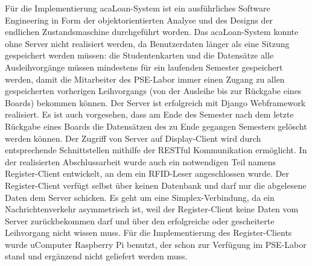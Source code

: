 Für die Implementierung acaLoan-System ist ein ausführliches Software Engineering in Form der objektorientierten Analyse und des Designs der endlichen Zustandsmaschine durchgeführt worden. Das acaLoan-System konnte ohne Server nicht realisiert werden, da Benutzerdaten länger als eine Sitzung gespeichert werden müssen: die Studentenkarten und die Datensätze alle Ausleihvorgänge müssen mindestens für ein laufenden Semester gespeichert werden, damit die Mitarbeiter des PSE-Labor immer einen Zugang zu allen gespeicherten vorherigen Leihvorgangs (von der Ausleihe bis zur Rückgabe eines Boards) bekommen können. Der Server ist erfolgreich mit Django Webframework realisiert. Es ist auch vorgesehen, dass am Ende des Semester nach dem letzte Rückgabe eines Boards die Datensätzen des zu Ende gegangen Semesters gelöscht werden können. Der Zugriff von Server auf Display-Client wird durch entsprechende Schnittstellen mithilfe der RESTful Kommunikation ermöglicht. In der realisierten Abschlussarbeit wurde auch ein notwendigen Teil namens Register-Client entwickelt, an dem ein RFID-Leser angeschlossen wurde. Der Register-Client verfügt selbst über keinen Datenbank und darf nur die abgelesene Daten dem Server schicken. Es geht um eine Simplex-Verbindung, da ein Nachrichtenverkehr asymmetrisch ist, weil der Register-Client keine Daten vom Server zurückbekommen darf und über den erfolgreiche oder gescheiterte Leihvorgang nicht wissen muss. Für die Implementierung des Register-Clients wurde uComputer Raspberry Pi benutzt, der schon zur Verfügung im PSE-Labor stand und ergänzend nicht geliefert werden muss. 